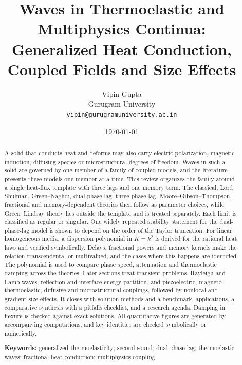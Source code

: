\documentclass[12pt,a4paper]{article}
\title{\bfseries Waves in Thermoelastic and Multiphysics Continua:\\
 Generalized Heat Conduction, Coupled Fields and Size Effects}
\author{Vipin Gupta\\{\small Gurugram University}\\{\small\texttt{vipin@gurugramuniversity.ac.in}}}
\date{\today}
\begin{document}
\maketitle

\begin{abstract}
A solid that conducts heat and deforms may also carry electric polarization, magnetic induction, diffusing species or microstructural degrees of freedom. Waves in such a solid are governed by one member of a family of coupled models, and the literature presents these models one member at a time. This review organizes the family around a single heat-flux template with three lags and one memory term. The classical, Lord--Shulman, Green--Naghdi, dual-phase-lag, three-phase-lag, Moore--Gibson--Thompson, fractional and memory-dependent theories then follow as parameter choices, while Green--Lindsay theory lies outside the template and is treated separately. Each limit is classified as regular or singular. One widely repeated stability statement for the dual-phase-lag model is shown to depend on the order of the Taylor truncation. For linear homogeneous media, a dispersion polynomial in $K=k^2$ is derived for the rational heat laws and verified symbolically. Delays, fractional powers and memory kernels make the relation transcendental or multivalued, and the cases where this happens are identified. The polynomial is used to compare phase speed, attenuation and thermoelastic damping across the theories. Later sections treat transient problems, Rayleigh and Lamb waves, reflection and interface energy partition, and piezoelectric, magneto-thermoelastic, diffusive and microstructural couplings, followed by nonlocal and gradient size effects. It closes with solution methods and a benchmark, applications, a comparative synthesis with a pitfalls checklist, and a research agenda. Damping in flexure is checked against exact solutions. All quantitative figures are generated by accompanying computations, and key identities are checked symbolically or numerically.
\medskip

\noindent\textbf{Keywords:} generalized thermoelasticity; second sound; dual-phase-lag; thermoelastic waves; fractional heat conduction; multiphysics coupling.
\end{abstract}


\newcommand{\demoteopen}{\begingroup\let\section\subsection\let\subsection\subsubsection}
\newcommand{\demoteclose}{\endgroup}
\setcounter{tocdepth}{2}
\label{sec:intro_ref}

\end{document}
